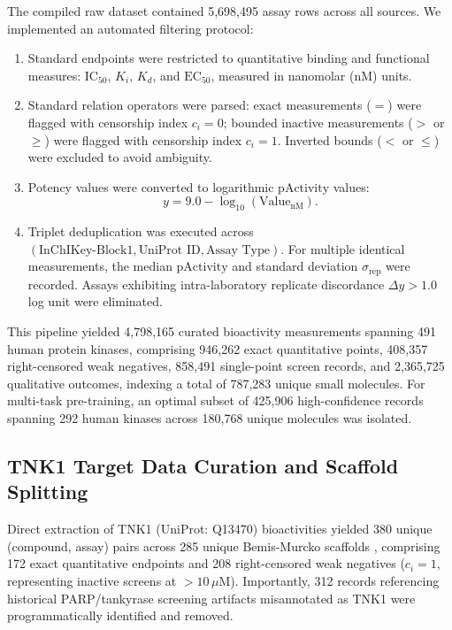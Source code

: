 \documentclass[journal]{IEEEtran}
\begin{document}
The compiled raw dataset contained 5,698,495 assay rows across all sources. We implemented an automated filtering protocol:
\begin{enumerate}
    \item Standard endpoints were restricted to quantitative binding and functional measures: $\text{IC}_{50}$, $K_i$, $K_d$, and $\text{EC}_{50}$, measured in nanomolar (nM) units.
    \item Standard relation operators were parsed: exact measurements ($=$) were flagged with censorship index $c_i = 0$; bounded inactive measurements ($>$ or $\ge$) were flagged with censorship index $c_i = 1$. Inverted bounds ($<$ or $\le$) were excluded to avoid ambiguity.
    \item Potency values were converted to logarithmic $\text{pActivity}$ values:
    \begin{equation}
        y = 9.0 - \log_{10}(\text{Value}_{\text{nM}}).
    \end{equation}
    \item Triplet deduplication was executed across $(\text{InChIKey-Block1}, \text{UniProt ID}, \text{Assay Type})$. For multiple identical measurements, the median $\text{pActivity}$ and standard deviation $\sigma_{\text{rep}}$ were recorded. Assays exhibiting intra-laboratory replicate discordance $\Delta y > 1.0$ log unit were eliminated.
\end{enumerate}

This pipeline yielded 4,798,165 curated bioactivity measurements spanning 491 human protein kinases, comprising 946,262 exact quantitative points, 408,357 right-censored weak negatives, 858,491 single-point screen records, and 2,365,725 qualitative outcomes, indexing a total of 787,283 unique small molecules. For multi-task pre-training, an optimal subset of 425,906 high-confidence records spanning 292 human kinases across 180,768 unique molecules was isolated.

\subsection{TNK1 Target Data Curation and Scaffold Splitting}
Direct extraction of TNK1 (UniProt: Q13470) bioactivities yielded 380 unique (compound, assay) pairs across 285 unique Bemis-Murcko scaffolds \cite{bemis1996properties}, comprising 172 exact quantitative endpoints and 208 right-censored weak negatives ($c_i = 1$, representing inactive screens at $>10\,\mu\text{M}$). Importantly, 312 records referencing historical PARP/tankyrase screening artifacts misannotated as TNK1 were programmatically identified and removed.
\end{document}
